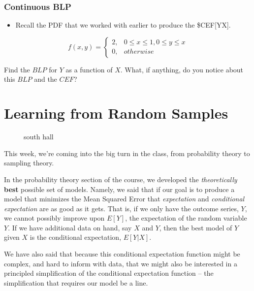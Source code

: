 \documentclass[
]{book}
\makeatletter
\newcommand*\pandocbounded[1]{%
  \sbox\pandoc@box{#1}%
  \Gscale@div\@tempa{\textheight}{\dimexpr\ht\pandoc@box+\dp\pandoc@box\relax}%
  \Gscale@div\@tempb{\linewidth}{\wd\pandoc@box}%
  \ifdim\@tempb\p@<\@tempa\p@\let\@tempa\@tempb\fi%
  \ifdim\@tempa\p@<\p@\scalebox{\@tempa}{\usebox\pandoc@box}%
  \else\usebox{\pandoc@box}%
  \fi%
}
\providecommand{\tightlist}{%
  \setlength{\itemsep}{0pt}\setlength{\parskip}{0pt}}
\theoremstyle{definition}
\theoremstyle{definition}
\theoremstyle{definition}
\theoremstyle{definition}
\theoremstyle{remark}
\makeatother
\begin{document}
\subsection{Continuous BLP}\label{continuous-blp}

\begin{itemize}
\tightlist
\item
  Recall the PDF that we worked with earlier to produce the \$CEF{[}Y\textbar X{]}.
\end{itemize}

\[
f(x,y) = 
  \begin{cases}
    2, & 0 \leq x \leq 1, 0 \leq y \leq x \\
    0, & otherwise
\end{cases}
\]

Find the \(BLP\) for \(Y\) as a function of \(X\). What, if anything, do you notice about this \(BLP\) and the \(CEF\)?

\vspace{20cm}

\chapter{Learning from Random Samples}\label{learning-from-random-samples}

\begin{figure}
\centering
\pandocbounded{\texttt{[image: ./images/south\_hall.jpeg]}}
\caption{south hall}
\end{figure}

This week, we're coming into the big turn in the class, from probability theory to sampling theory.

In the probability theory section of the course, we developed the \emph{theoretically} \textbf{best} possible set of models. Namely, we said that if our goal is to produce a model that minimizes the Mean Squared Error that \emph{expectation} and \emph{conditional expectation} are as good as it gets. That is, if we only have the outcome series, \(Y\), we cannot possibly improve upon \(E[Y]\), the expectation of the random variable \(Y\). If we have additional data on hand, say \(X\) and \(Y\), then the best model of \(Y\) given \(X\) is the conditional expectation, \(E[Y|X]\).

We have also said that because this conditional expectation function might be complex, and hard to inform with data, that we might also be interested in a principled simplification of the conditional expectation function -- the simplification that requires our model be a line.
\end{document}
